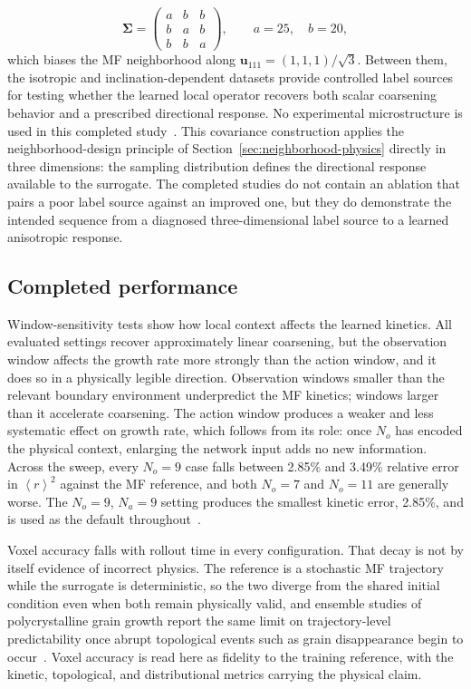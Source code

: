 \documentclass[proposalMode]{ufdissertation}
\begin{document}
\[
\boldsymbol{\Sigma}
=
\begin{pmatrix}
a & b & b\\
b & a & b\\
b & b & a
\end{pmatrix},
\qquad
a=25,\quad b=20,
\]
which biases the MF neighborhood along
\(\mathbf{u}_{111}=(1,1,1)/\sqrt{3}\). Between them, the isotropic and inclination-dependent datasets provide controlled label sources for testing whether the learned local operator recovers both scalar coarsening behavior and a prescribed directional response. No experimental microstructure is used in this completed study~\cite{tian2026threeDprimme}.
This covariance construction applies the neighborhood-design principle of Section~\ref{sec:neighborhood-physics} directly in three dimensions: the sampling distribution defines the directional response available to the surrogate. The completed studies do not contain an ablation that pairs a poor label source against an improved one, but they do demonstrate the intended sequence from a diagnosed three-dimensional label source to a learned anisotropic response.

\subsection{Completed performance}

Window-sensitivity tests show how local context affects the learned kinetics. All evaluated settings recover approximately linear coarsening, but the observation window affects the growth rate more strongly than the action window, and it does so in a physically legible direction. Observation windows smaller than the relevant boundary environment underpredict the MF kinetics; windows larger than it accelerate coarsening. The action window produces a weaker and less systematic effect on growth rate, which follows from its role: once \(N_o\) has encoded the physical context, enlarging the network input adds no new information. Across the sweep, every \(N_o=9\) case falls between 2.85\% and 3.49\% relative error in \(\left\langle r\right\rangle^2\) against the MF reference, and both \(N_o=7\) and \(N_o=11\) are generally worse. The \(N_o=9\), \(N_a=9\) setting produces the smallest kinetic error, 2.85\%, and is used as the default throughout~\cite{tian2026threeDprimme}.

Voxel accuracy falls with rollout time in every configuration. That decay is not by itself evidence of incorrect physics. The reference is a stochastic MF trajectory while the surrogate is deterministic, so the two diverge from the shared initial condition even when both remain physically valid, and ensemble studies of polycrystalline grain growth report the same limit on trajectory-level predictability once abrupt topological events such as grain disappearance begin to occur~\cite{lyu2026predictivity}. Voxel accuracy is read here as fidelity to the training reference, with the kinetic, topological, and distributional metrics carrying the physical claim.
\end{document}
